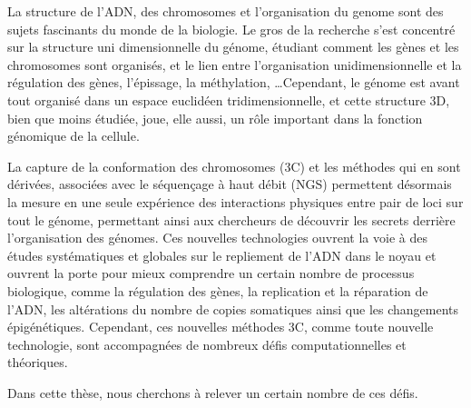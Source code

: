\begin{resumes}

La structure de l'ADN, des chromosomes et l'organisation du genome sont des
sujets fascinants du monde de la biologie. Le gros de la recherche s'est
concentré sur la structure uni dimensionnelle du génome, étudiant comment les
gènes et les chromosomes sont organisés, et le lien entre l'organisation
unidimensionnelle et la régulation des gènes, l'épissage, la méthylation,
\dots Cependant, le génome est avant tout organisé dans un espace euclidéen
tridimensionnelle, et cette structure 3D, bien que moins étudiée, joue, elle
aussi, un rôle important dans la fonction génomique de la cellule.

La capture de la conformation des chromosomes (3C) et les méthodes qui en sont
dérivées, associées avec le séquençage à haut débit (NGS) permettent désormais
la mesure en une seule expérience des interactions physiques entre pair de
loci sur tout le génome, permettant ainsi aux chercheurs de découvrir les
secrets derrière l'organisation des génomes. Ces nouvelles technologies
ouvrent la voie à des études systématiques et globales sur le repliement de
l'ADN dans le noyau et ouvrent la porte pour mieux comprendre un certain
nombre de processus biologique, comme la régulation des gènes, la replication
et la réparation de l'ADN, les altérations du nombre de copies somatiques ainsi
que les changements épigénétiques. Cependant, ces nouvelles méthodes 3C, comme
toute nouvelle technologie, sont accompagnées de nombreux défis
computationnelles et théoriques.

Dans cette thèse, nous cherchons à relever un certain nombre de ces défis.


\end{resumes}

